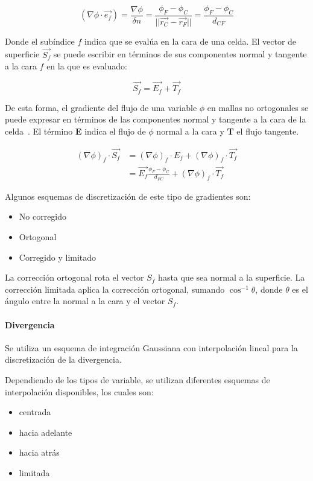 \begin{equation}
  \label{eq:gradiente_normal}
  (\nabla \phi \cdot \vec{e_{f}}) = \frac{\nabla\phi}{\delta n} = \frac{\phi_{F} - \phi_{C}}{||\vec{r_{C}}-\vec{r_{F}}||} = \frac{\phi_{F} - \phi_{C}}{d_{CF}}
\end{equation}

Donde el subíndice $f$ indica que se evalúa en la cara de una celda.
%
El vector de superficie $\vec{S_{f}}$ se puede escribir en términos de sus
componentes normal y tangente a la cara $f$ en la que es evaluado:

\begin{equation}
  \vec{S_{f}}= \vec{E_{f}} + \vec{T_{f}}
\end{equation}

De esta forma, el gradiente del flujo de una variable $\phi$ en mallas no
ortogonales se puede expresar en términos de las componentes normal y tangente a
la cara de la celda~\parencite{moukalled}.
%
El término \textbf{E} indica el flujo de $\phi$ normal a la cara y \textbf{T} el
flujo tangente.

\begin{align}
  \label{eq:gradiente}
  {(\nabla \phi)}_{f}\cdot \vec{S_{f}} &= {(\nabla \phi)}_{f}\cdot E_{f} + {(\nabla \phi)}_{f}\cdot \vec{T_{f}} \\
  &= \vec{E_{f}}\frac{\phi_{F}-\phi_{C}}{d_{FC}}+ {(\nabla \phi)}_{f}\cdot \vec{T_{f}}
\end{align}

%
Algunos esquemas de discretización de este tipo de gradientes son:
\begin{itemize}
  \item No corregido
  \item Ortogonal
  \item Corregido y limitado
\end{itemize}

La corrección ortogonal rota el vector $S_{f}$ hasta que sea normal a la superficie.
%
La corrección limitada aplica la corrección ortogonal, sumando
$\cos^{-1}{\theta}$, donde $\theta$ es el ángulo entre la normal a la cara y el
vector $S_{f}$.

\paragraph{Divergencia}
%
Se utiliza un esquema de integración Gaussiana con interpolación lineal para
la discretización de la divergencia.

Dependiendo de los tipos de variable, se utilizan diferentes esquemas de
interpolación disponibles, los cuales son:
%
\begin{itemize}
        \item centrada
        \item hacia adelante
        \item hacia atrás
        \item limitada
\end{itemize}

